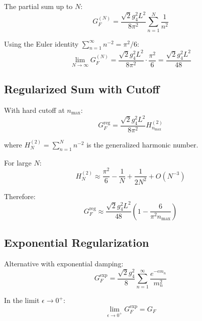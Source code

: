 \documentclass[11pt,a4paper]{article}
\begin{document}
The partial sum up to $N$:
\begin{equation}
\label{eq:gf-partial-sum}
G_F^{(N)} = \frac{\sqrt{2} g_4^2 L^2}{8\pi^2} \sum_{n=1}^{N} \frac{1}{n^2}
\end{equation}

Using the Euler identity $\sum_{n=1}^\infty n^{-2} = \pi^2/6$:
\begin{equation}
\label{eq:gf-euler}
\lim_{N\to\infty} G_F^{(N)} = \frac{\sqrt{2} g_4^2 L^2}{8\pi^2} \cdot \frac{\pi^2}{6} = \frac{\sqrt{2} g_4^2 L^2}{48}
\end{equation}

\subsection{Regularized Sum with Cutoff}
\label{app:cutoff-sum}

With hard cutoff at $n_{\max}$:
\begin{equation}
\label{eq:gf-cutoff}
G_F^{\text{reg}} = \frac{\sqrt{2} g_4^2 L^2}{8\pi^2} H_{n_{\max}}^{(2)}
\end{equation}

where $H_N^{(2)} = \sum_{n=1}^N n^{-2}$ is the generalized harmonic number.

For large $N$:
\begin{equation}
\label{eq:harmonic-asymptotic}
H_N^{(2)} \approx \frac{\pi^2}{6} - \frac{1}{N} + \frac{1}{2N^2} + O(N^{-3})
\end{equation}

Therefore:
\begin{equation}
\label{eq:gf-asymptotic}
G_F^{\text{reg}} \approx \frac{\sqrt{2} g_4^2 L^2}{48} \left(1 - \frac{6}{\pi^2 n_{\max}}\right)
\end{equation}

\subsection{Exponential Regularization}
\label{app:exp-regularization}

Alternative with exponential damping:
\begin{equation}
\label{eq:gf-exp-reg}
G_F^{\text{exp}} = \frac{\sqrt{2} g_4^2}{8} \sum_{n=1}^{\infty} \frac{e^{-\epsilon m_n}}{m_n^2}
\end{equation}

In the limit $\epsilon \to 0^+$:
\begin{equation}
\label{eq:gf-exp-limit}
\lim_{\epsilon \to 0^+} G_F^{\text{exp}} = G_F
\end{equation}
\end{document}
